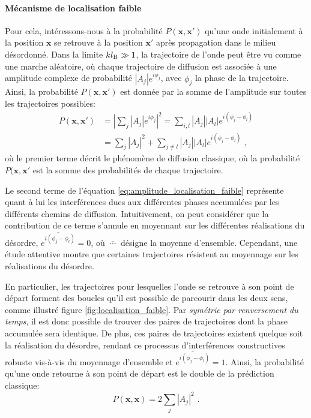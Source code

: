 \paragraph*{Mécanisme de localisation faible}
Pour cela, intéressons-nous à la probabilité $P(\mathbf{x},\mathbf{x}')$ qu'une onde initialement à la position $\mathbf{x}$ se retrouve à la position $\mathbf{x}'$ après propagation dans le milieu désordonné. Dans la limite $kl_{\mathrm{B}}\gg 1$, la trajectoire de l'onde peut être vu comme une marche aléatoire, où chaque trajectoire de diffusion est associée à une amplitude complexe de probabilité $\left| A_j \right| e^{i \phi_j}$, avec $\phi_j$ la phase de la trajectoire. Ainsi, la probabilité $P(\mathbf{x},\mathbf{x}')$ est donnée par la somme de l'amplitude sur toutes les trajectoires possibles:
\begin{align}
P(\mathbf{x},\mathbf{x}') \nonumber&= {\left| \sum_j{ \left|A_j\right| e^{i \phi_j} }\right| }^2 = \sum_{i,l} {\left| A_j \right| \left| A_l \right| e^{i (\phi_j - \phi_l)}} \\
&= \sum_j{{\left| A_j \right|}^2} + \sum_{j\neq l}{\left| A_j \right| \left|A_l \right| e^{i(\phi_j - \phi_l)}} \text{ ,}
\label{eq:amplitude_localisation_faible}
\end{align}
où le premier terme décrit le phénomène de diffusion classique, où la probabilité $P(\mathbf{x},\mathbf{x}'$ est la somme des probabilités de chaque trajectoire. 

Le second terme de l'équation \ref{eq:amplitude_localisation_faible} représente quant à lui les interférences dues aux différentes phases accumulées par les différents chemins de diffusion. Intuitivement, on peut considérer que la contribution de ce terme s'annule en moyennant sur les différentes réalisations du désordre, $\overline{e^{i(\phi_j - \phi_l)}}=0$, où $\overline{\:\cdots\:}$ désigne la moyenne d'ensemble. Cependant, une étude attentive montre que certaines trajectoires résistent au moyennage sur les réalisations du désordre.

En particulier, les trajectoires pour lesquelles l'onde se retrouve à son point de départ forment des boucles qu'il est possible de parcourir dans les deux sens, comme illustré figure \ref{fig:localisation_faible}. Par \emph{symétrie par renversement du temps}, il est donc possible de trouver des paires de trajectoires dont la phase accumulée sera identique. De plus, ces paires de trajectoires existent quelque soit la réalisation du désordre, rendant ce processus d'interférences constructives robuste vis-à-vis du moyennage d'ensemble et $\overline{e^{i(\phi_j - \phi_l)}}=1$. Ainsi, la probabilité qu'une onde retourne à son point de départ est le double de la prédiction classique:
\begin{equation}
P(\mathbf{x},\mathbf{x})=2 \sum_j{{\left| A_j \right|}^2} \text{ .}
\end{equation}

